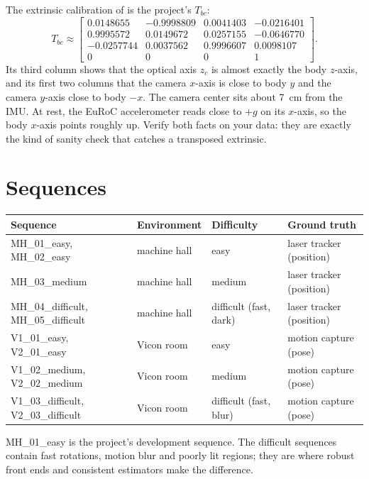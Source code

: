 The extrinsic calibration  of  is the project's $T_{bc}$:
\begin{equation*}
  T_{bc} \approx \begin{bmatrix}
    0.0148655 & -0.9998809 & 0.0041403 & -0.0216401 \\
    0.9995572 & 0.0149672 & 0.0257155 & -0.0646770 \\
    -0.0257744 & 0.0037562 & 0.9996607 & 0.0098107 \\
    0 & 0 & 0 & 1
  \end{bmatrix}.
\end{equation*}
Its third column shows that the optical axis $z_c$ is almost exactly the body $z$-axis, and its first two columns that the camera
$x$-axis is close to body $y$ and the camera $y$-axis close to body $-x$. The camera center sits about 7~cm from the IMU. At rest, the
EuRoC accelerometer reads close to $+g$ on its $x$-axis, so the body $x$-axis points roughly up. Verify both facts on your data: they are
exactly the kind of sanity check that catches a transposed extrinsic.

\section*{Sequences}

\begin{center}\small
\begin{tabular}{@{}l l l l@{}}
\toprule
Sequence & Environment & Difficulty & Ground truth \\
\midrule
MH\_01\_easy, MH\_02\_easy & machine hall & easy & laser tracker (position) \\
MH\_03\_medium & machine hall & medium & laser tracker (position) \\
MH\_04\_difficult, MH\_05\_difficult & machine hall & difficult (fast, dark) & laser tracker (position) \\
V1\_01\_easy, V2\_01\_easy & Vicon room & easy & motion capture (pose) \\
V1\_02\_medium, V2\_02\_medium & Vicon room & medium & motion capture (pose) \\
V1\_03\_difficult, V2\_03\_difficult & Vicon room & difficult (fast, blur) & motion capture (pose) \\
\bottomrule
\end{tabular}
\end{center}

MH\_01\_easy is the project's development sequence. The difficult sequences contain fast rotations, motion blur and poorly lit
regions; they are where robust front ends and consistent estimators make the difference.
